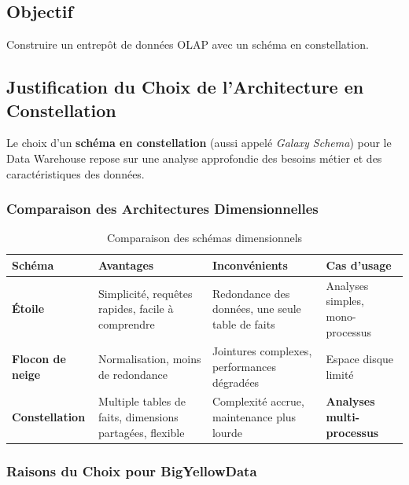 \documentclass[12pt,a4paper]{report}
\begin{document}
\subsection{Objectif}

Construire un entrepôt de données OLAP avec un schéma en constellation.

\subsection{Justification du Choix de l'Architecture en Constellation}

Le choix d'un \textbf{schéma en constellation} (aussi appelé \textit{Galaxy Schema}) pour le Data Warehouse repose sur une analyse approfondie des besoins métier et des caractéristiques des données.

\subsubsection{Comparaison des Architectures Dimensionnelles}

\begin{table}[H]
\centering
\caption{Comparaison des schémas dimensionnels}
\begin{tabular}{@{}p{2.5cm}p{4cm}p{4cm}p{3cm}@{}}
\toprule
\textbf{Schéma} & \textbf{Avantages} & \textbf{Inconvénients} & \textbf{Cas d'usage} \\
\midrule
\textbf{Étoile} &
Simplicité, requêtes rapides, facile à comprendre &
Redondance des données, une seule table de faits &
Analyses simples, mono-processus \\
\midrule
\textbf{Flocon de neige} &
Normalisation, moins de redondance &
Jointures complexes, performances dégradées &
Espace disque limité \\
\midrule
\textbf{Constellation} &
Multiple tables de faits, dimensions partagées, flexible &
Complexité accrue, maintenance plus lourde &
\textbf{Analyses multi-processus} \\
\bottomrule
\end{tabular}
\end{table}

\subsubsection{Raisons du Choix pour BigYellowData}
\end{document}
